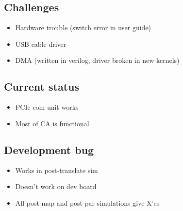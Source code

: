 \subsection{Challenges}

\begin{itemize}
    \item Hardware trouble (switch error in user guide)
    \item USB cable driver
    \item DMA (written in verilog, driver broken in new kernels)
\end{itemize}

\subsection{Current status}

\begin{itemize}
    \item PCIe com unit works
    \item Most of CA is functional
\end{itemize}

\subsection{Development bug}

\begin{itemize}
    \item Works in post-translate sim
    \item Doesn't work on dev board
    \item All post-map and post-par simulations give X'es
\end{itemize}

